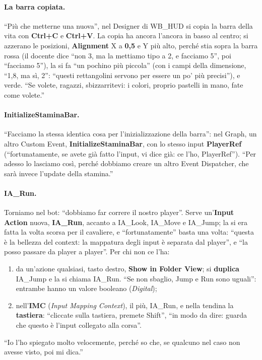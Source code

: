 \paragraph{La barra copiata.} ``Più che metterne una nuova'', nel Designer di WB\_HUD si
copia la barra della vita con \textbf{Ctrl+C} e \textbf{Ctrl+V}. La copia ha ancora
l'ancora in basso al centro; si azzerano le posizioni, \textbf{Alignment} X a \textbf{0,5}
e Y più alto, perché stia sopra la barra rossa (il docente dice ``non 3, ma la mettiamo
tipo a 2, e facciamo 5'', poi ``facciamo 5''), la si fa ``un pochino più piccola'' (con i
campi della dimensione, ``1,8, ma sì, 2'': ``questi rettangolini servono per essere un po'
più precisi''), e verde. ``Se volete, ragazzi, sbizzarritevi: i colori, proprio pastelli in
mano, fate come volete.''

\paragraph{InitializeStaminaBar.} ``Facciamo la stessa identica cosa per l'inizializzazione
della barra'': nel Graph, un altro Custom Event, \textbf{InitializeStaminaBar}, con lo
stesso input \textbf{PlayerRef} (``fortunatamente, se avete già fatto l'input, vi dice già:
ce l'ho, PlayerRef''). ``Per adesso lo lasciamo così, perché dobbiamo creare un altro
Event Dispatcher, che sarà invece l'update della stamina.''

\paragraph{IA\_Run.} Torniamo nel bot: ``dobbiamo far correre il nostro player''. Serve
un'\textbf{Input Action} nuova, \textbf{IA\_Run}, accanto a IA\_Look, IA\_Move e IA\_Jump;
la si era fatta la volta scorsa per il cavaliere, e ``fortunatamente'' basta una volta:
``questa è la bellezza del context: la mappatura degli input è separata dal player'', e
``la posso passare da player a player''. Per chi non ce l'ha:
\begin{enumerate}
  \item da un'azione qualsiasi, tasto destro, \textbf{Show in Folder View}; si
        \textbf{duplica} IA\_Jump e la si chiama IA\_Run. ``Se non sbaglio, Jump e Run
        sono uguali'': entrambe hanno un valore booleano (\emph{Digital});
  \item nell'\textbf{IMC} (\emph{Input Mapping Context}), il più, IA\_Run, e nella
        tendina la \textbf{tastiera}: ``cliccate sulla tastiera, premete Shift'', ``in modo
        da dire: guarda che questo è l'input collegato alla corsa''.
\end{enumerate}
``Io l'ho spiegato molto velocemente, perché so che, se qualcuno nel caso non avesse
visto, poi mi dica.''

